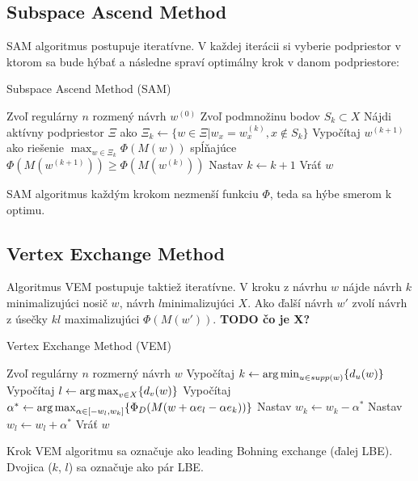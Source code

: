 \subsection{Subspace Ascend Method}

SAM algoritmus postupuje iteratívne. V každej iterácii si vyberie podpriestor v ktorom sa bude hýbať a následne spraví optimálny krok v danom podpriestore:

\begin{algorithm}[H]
	\caption{Subspace Ascend Method (SAM) \cite{rex_harman}}
	\label{sam}
	\begin{algorithmic}[1]
		\State Zvoľ regulárny $n$ rozmený návrh $w^{(0)}$
			\State Zvoľ podmnožinu bodov $S_k \subset X$
			\State Nájdi aktívny podpriestor $\Xi$ ako $\Xi_k \leftarrow \{ w \in \Xi | w_x = w_x^{(k)}, x \not \in S_k \}$
			\State Vypočítaj $w^{(k+1)}$ ako riešenie $\max_{w \in \Xi_k} \Phi(M(w))$ spĺňajúce $\Phi(M(w^{(k+1)})) \geq \Phi(M(w^{(k)}))$
			\State Nastav $k \leftarrow k+1$
		\EndWhile
		\State Vráť $w$
	\end{algorithmic}
\end{algorithm}

SAM algoritmus každým krokom nezmenší funkciu $\Phi$, teda sa hýbe smerom k optimu.

\subsection{Vertex Exchange Method}

Algoritmus VEM postupuje taktiež iteratívne. V kroku z návrhu $w$ nájde návrh $k$ minimalizujúci nosič $w$, návrh $l$minimalizujúci $X$. Ako ďalší návrh $w'$ zvolí návrh z úsečky $kl$ maximalizujúci $\Phi(M(w'))$. \textbf{TODO čo je X?}

\begin{algorithm}[H]
	\caption{Vertex Exchange Method (VEM) \cite{rex_harman}}
	\label{vem}
	\begin{algorithmic}[1]
		\State Zvoľ regulárny $n$ rozmerný návrh $w$
			\State Vypočítaj $k \leftarrow \operatorname*{arg\,min}_{u \in supp(w)} \{ d_u(w)\}$
			\State Vypočítaj $l \leftarrow \operatorname*{arg\,max}_{v \in X} \{ d_v(w)\}$
			\State Vypočítaj $\alpha^* \leftarrow \operatorname*{arg\,max}_{\alpha \in [-w_l, w_k]} \{ \Phi_D (M(w+\alpha e_l -\alpha e_k))\}$
			\State Nastav $w_k \leftarrow w_k - \alpha^*$
			\State Nastav $w_l \leftarrow w_l + \alpha^*$
		\EndWhile
		\State Vráť $w$
	\end{algorithmic}
\end{algorithm}

Krok VEM algoritmu sa označuje ako leading Bohning exchange (ďalej LBE). Dvojica ($k$, $l$) sa označuje ako pár LBE.
